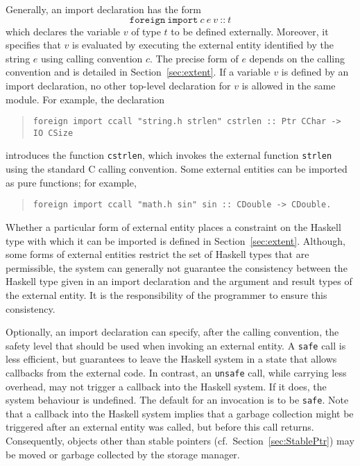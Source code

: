 \documentclass[a4paper,twoside]{article}
\newcommand{\code}[1]{\texttt{#1}}      %
\begin{document}
Generally, an import declaration has the form
%
\[
\code{foreign}~\code{import}~c~e~v~\code{{::}}~t
\]
%
which declares the variable $v$ of type $t$ to be defined externally.
Moreover, it specifies that $v$ is evaluated by executing the external entity
identified by the string $e$ using calling convention $c$.  The precise form
of $e$ depends on the calling convention and is detailed in
Section~\ref{sec:extent}.  If a variable $v$ is defined by an import
declaration, no other top-level declaration for $v$ is allowed in the same
module.  For example, the declaration
%
\begin{quote}
\begin{verbatim}
foreign import ccall "string.h strlen" cstrlen :: Ptr CChar -> IO CSize
\end{verbatim}
\end{quote}
%
introduces the function \code{cstrlen}, which invokes the external function
\code{strlen} using the standard C calling convention.  Some external entities
can be imported as pure functions; for example,
%
\begin{quote}
\begin{verbatim}
foreign import ccall "math.h sin" sin :: CDouble -> CDouble.
\end{verbatim}
\end{quote}
%
Whether a particular form of external entity places a constraint on the
Haskell type with which it can be imported is defined in
Section~\ref{sec:extent}.  Although, some forms of external entities restrict
the set of Haskell types that are permissible, the system can generally not
guarantee the consistency between the Haskell type given in an import
declaration and the argument and result types of the external entity.  It is
the responsibility of the programmer to ensure this consistency.

Optionally, an import declaration can specify, after the calling convention,
the safety level that should be used when invoking an external entity.  A
\code{safe} call is less efficient, but guarantees to leave the Haskell system
in a state that allows callbacks from the external code.  In contrast, an
\code{unsafe} call, while carrying less overhead, may not trigger a callback
into the Haskell system.  If it does, the system behaviour is undefined.  The
default for an invocation is to be \code{safe}.  Note that a callback into
the Haskell system implies that a garbage collection might be triggered after
an external entity was called, but before this call returns.  Consequently,
objects other than stable pointers (cf.\ Section~\ref{sec:StablePtr}) may be
moved or garbage collected by the storage manager.
\end{document}
